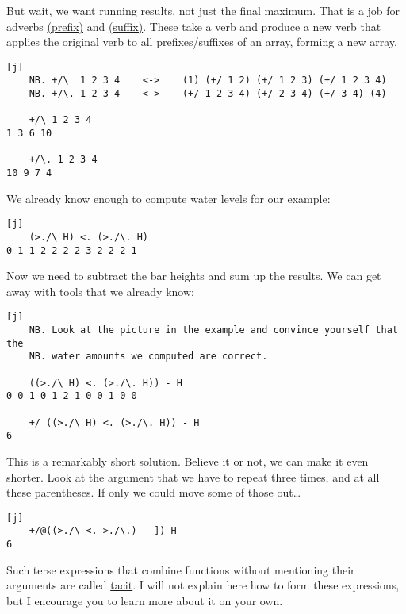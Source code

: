 \documentclass{article}
\begin{document}
But wait, we want running results, not just the final maximum.
That is a job for adverbs \href{https://code.jsoftware.com/wiki/Vocabulary/bslash}{\code{\\} (prefix)} and \href{https://code.jsoftware.com/wiki/Vocabulary/bslashdot}{ (suffix)}.
These take a verb and produce a new verb that applies the original verb to all prefixes/suffixes of an array, forming a new array.

\begin{verbatim}[j]
    NB. +/\  1 2 3 4    <->    (1) (+/ 1 2) (+/ 1 2 3) (+/ 1 2 3 4)
    NB. +/\. 1 2 3 4    <->    (+/ 1 2 3 4) (+/ 2 3 4) (+/ 3 4) (4)

    +/\ 1 2 3 4
1 3 6 10

    +/\. 1 2 3 4
10 9 7 4
\end{verbatim}

We already know enough to compute water levels for our example:

\begin{verbatim}[j]
    (>./\ H) <. (>./\. H)
0 1 1 2 2 2 2 3 2 2 2 1
\end{verbatim}

Now we need to subtract the bar heights and sum up the results.
We can get away with tools that we already know:

\begin{verbatim}[j]
    NB. Look at the picture in the example and convince yourself that the
    NB. water amounts we computed are correct.

    ((>./\ H) <. (>./\. H)) - H
0 0 1 0 1 2 1 0 0 1 0 0

    +/ ((>./\ H) <. (>./\. H)) - H
6
\end{verbatim}

This is a remarkably short solution.
Believe it or not, we can make it even shorter.
Look at the argument that we have to repeat three times, and at all these parentheses.
If only we could move some of those out\ldots

\begin{verbatim}[j]
    +/@((>./\ <. >./\.) - ]) H
6
\end{verbatim}

Such terse expressions that combine functions without mentioning their arguments are called \href{https://www.jsoftware.com/help/jforc/tacit_programs.htm}{tacit}.
I will not explain here how to form these expressions, but I encourage you to learn more about it on your own.
\end{document}
